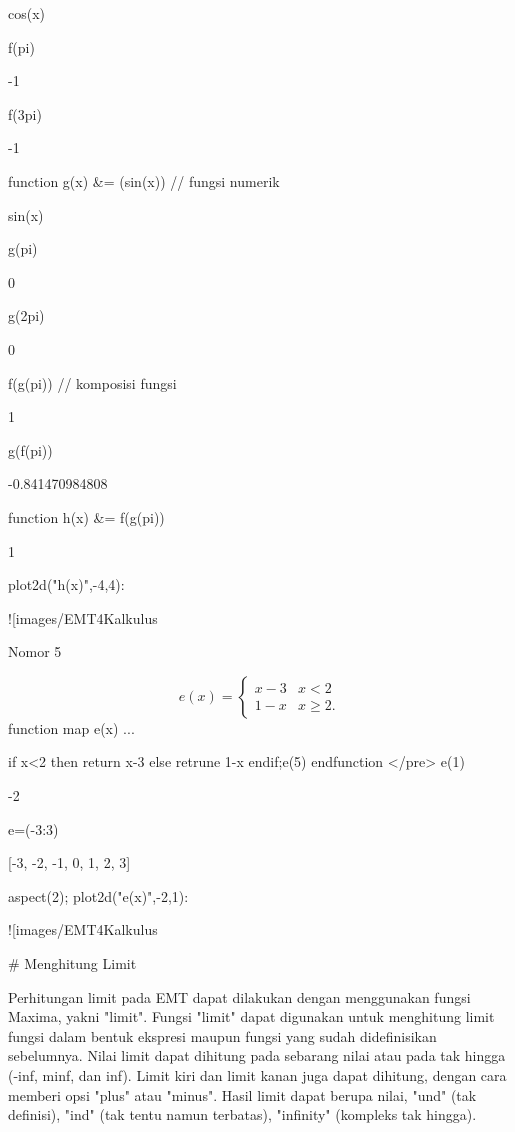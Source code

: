 \documentclass{article}
\begin{document}
    
                                    cos(x)
    

\>f(pi)


    -1

\>f(3\*pi)


    -1

\>function g(x) &= (sin(x)) // fungsi numerik


    
                                    sin(x)
    

\>g(pi)


    0

\>g(2\*pi)


    0

\>f(g(pi)) // komposisi fungsi


    1

\>g(f(pi))


    -0.841470984808

\>function h(x) &= f(g(pi))


    
                                      1
    

\>plot2d("h(x)",-4,4):


![images/EMT4Kalkulus%

Nomor 5


$$e(x) = \begin{cases} x-3 & x<2 \\ 1-x & x\ge2. \end{cases}$$\>function map e(x) ...


    if x<2 then return x-3
    else retrune 1-x
    endif;e(5)
    endfunction
</pre>
\>e(1)


    -2

\>e=(-3:3)


    [-3,  -2,  -1,  0,  1,  2,  3]

\>aspect(2); plot2d("e(x)",-2,1):


![images/EMT4Kalkulus%

# Menghitung Limit

Perhitungan limit pada EMT dapat dilakukan dengan menggunakan fungsi
Maxima, yakni "limit". Fungsi "limit" dapat digunakan untuk menghitung
limit fungsi dalam bentuk ekspresi maupun fungsi yang sudah
didefinisikan sebelumnya. Nilai limit dapat dihitung pada sebarang
nilai atau pada tak hingga (-inf, minf, dan inf). Limit kiri dan limit
kanan juga dapat dihitung, dengan cara memberi opsi "plus" atau
"minus". Hasil limit dapat berupa nilai, "und" (tak definisi), "ind"
(tak tentu namun terbatas), "infinity" (kompleks tak hingga).
\end{document}
